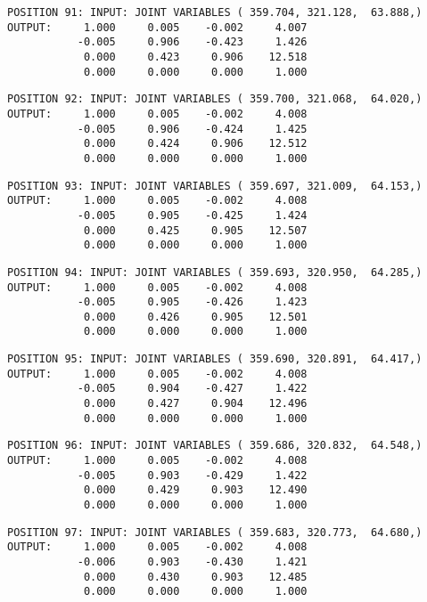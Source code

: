 \begin{verbatim}
POSITION 91: INPUT: JOINT VARIABLES ( 359.704, 321.128,  63.888,)
OUTPUT:     1.000     0.005    -0.002     4.007
           -0.005     0.906    -0.423     1.426
            0.000     0.423     0.906    12.518
            0.000     0.000     0.000     1.000
\end{verbatim} \pagebreak[1]\begin{verbatim}
POSITION 92: INPUT: JOINT VARIABLES ( 359.700, 321.068,  64.020,)
OUTPUT:     1.000     0.005    -0.002     4.008
           -0.005     0.906    -0.424     1.425
            0.000     0.424     0.906    12.512
            0.000     0.000     0.000     1.000
\end{verbatim} \pagebreak[1]\begin{verbatim}
POSITION 93: INPUT: JOINT VARIABLES ( 359.697, 321.009,  64.153,)
OUTPUT:     1.000     0.005    -0.002     4.008
           -0.005     0.905    -0.425     1.424
            0.000     0.425     0.905    12.507
            0.000     0.000     0.000     1.000
\end{verbatim} \pagebreak[1]\begin{verbatim}
POSITION 94: INPUT: JOINT VARIABLES ( 359.693, 320.950,  64.285,)
OUTPUT:     1.000     0.005    -0.002     4.008
           -0.005     0.905    -0.426     1.423
            0.000     0.426     0.905    12.501
            0.000     0.000     0.000     1.000
\end{verbatim} \pagebreak[1]\begin{verbatim}
POSITION 95: INPUT: JOINT VARIABLES ( 359.690, 320.891,  64.417,)
OUTPUT:     1.000     0.005    -0.002     4.008
           -0.005     0.904    -0.427     1.422
            0.000     0.427     0.904    12.496
            0.000     0.000     0.000     1.000
\end{verbatim} \pagebreak[1]\begin{verbatim}
POSITION 96: INPUT: JOINT VARIABLES ( 359.686, 320.832,  64.548,)
OUTPUT:     1.000     0.005    -0.002     4.008
           -0.005     0.903    -0.429     1.422
            0.000     0.429     0.903    12.490
            0.000     0.000     0.000     1.000
\end{verbatim} \pagebreak[1]\begin{verbatim}
POSITION 97: INPUT: JOINT VARIABLES ( 359.683, 320.773,  64.680,)
OUTPUT:     1.000     0.005    -0.002     4.008
           -0.006     0.903    -0.430     1.421
            0.000     0.430     0.903    12.485
            0.000     0.000     0.000     1.000
\end{verbatim} \pagebreak[1]\begin{verbatim}

\end{verbatim}
